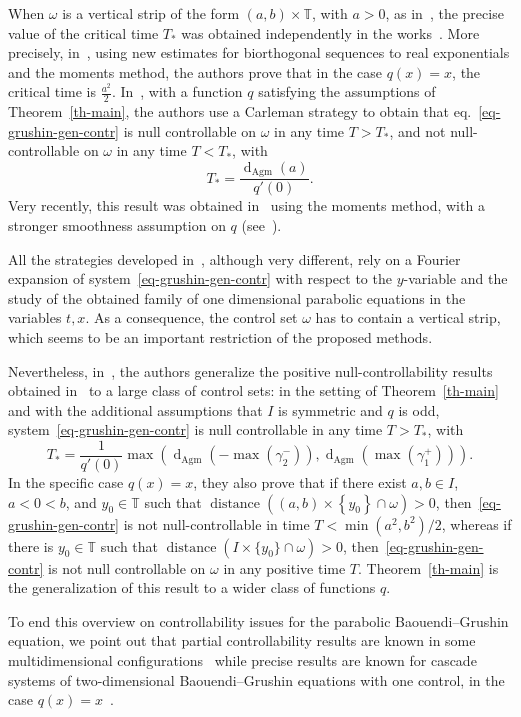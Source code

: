 \documentclass[AHL,Unicode,longabstracts,published]{cedram}
\newcommand{\1}{\mathds 1}
\DeclareMathOperator{\distance}{distance}
\newcommand{\dagmon}{\mathop{\mathrm{d}}\nolimits_{\mathrm{Agm}}}
\newcommand{\T}{\mathbb{T}}
\newcommand{\g}{\gamma}
\renewcommand{\o}{\omega}
\renewcommand{\o}{\omega}
\begin{document}
When $\omega$ is a vertical strip of the form $(a,b) \times \T$, with $a>0$, as in~\cite{BCG14}, the precise value of the critical time $T_*$ was obtained independently in the works~\cite{ABM21,BDE20,LL22a}. More precisely, in~\cite{ABM21}, using new estimates for biorthogonal sequences to real exponentials and the moments method, the authors prove that in the case $q(x) = x$, the critical time is $\frac{a^2}{2}$. In~\cite{BDE20}, with a function $q$ satisfying the assumptions of Theorem~\ref{th-main}, the authors use a Carleman strategy to obtain that eq.~\eqref{eq-grushin-gen-contr} is null controllable on $\o$ in any time $T> T_*$, and not null-controllable on $\o$ in any time $T < T_*$, with
\[
T_* = \frac{\dagmon(a)}{q'(0)}.
\]
Very recently, this result was obtained in~\cite{LL22a} using the moments method, with a stronger smoothness assumption on $q$ (see~\cite[Remark~1.12 and Proposition~1.13]{LL22a}).

All the strategies developed in~\cite{ABM21,BCG14,BDE20,BMM15}, although very different, rely on a Fourier expansion of system~\eqref{eq-grushin-gen-contr} with respect to the $y$-variable and the study of the obtained family of one dimensional parabolic equations in the variables $t,x$. As a consequence, the control set $\omega$ has to contain a vertical strip, which seems to be an important restriction of the proposed methods.

Nevertheless, in~\cite{DK20}, the authors generalize the positive null-controllability results obtained in~\cite{BDE20} to a large class of control sets: in the setting of Theorem~\ref{th-main} and with the additional assumptions that $I$ is symmetric and $q$ is odd, system~\eqref{eq-grushin-gen-contr} is null controllable in any time $T>T_*$, with
\[
T_* = \dfrac1{q'(0)}\max\left(\dagmon(-\max(\g_2^-)),\dagmon(\max(\g_1^+))\right).
\]
In the specific case $q(x) = x$, they also prove that if there exist $a,b \in I$, $a < 0 <b$, and $y_0 \in \T$ such that $\distance((a,b) \times \left\lbrace y_0 \right\rbrace \cap \omega) > 0$, then~\eqref{eq-grushin-gen-contr} is not null-controllable in time $T< \min(a^2, b^2)/2$, whereas if there is $y_0 \in \T$ such that $\distance (I\times \lbrace y_0 \rbrace \cap \o) > 0$, then~\eqref{eq-grushin-gen-contr} is not null controllable on $\o$ in any positive time $T$. Theorem~\ref{th-main} is the generalization of this result to a wider class of functions $q$.

To end this overview on controllability issues for the parabolic Baouendi--Grushin equation, we point out that partial controllability results are known in some multidimensional configurations~\cite{BDE20} while precise results are known for cascade systems of two-dimensional Baouendi--Grushin equations with one control, in the case $q(x) = x$~\cite{ABM21}.
\end{document}
